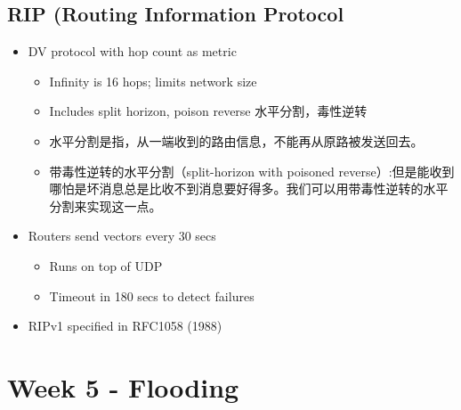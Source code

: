 \documentclass[12pt]{ctexart}   %
\begin{document}
	\subsection{RIP (Routing Information Protocol}
	\begin{itemize}
		\item DV protocol with hop count as metric
		\begin{itemize}
			\item Infinity is 16 hops; limits network size
			\item Includes split horizon, poison reverse 水平分割，毒性逆转
			\item 水平分割是指，从一端收到的路由信息，不能再从原路被发送回去。
			\item 带毒性逆转的水平分割（split-horizon with poisoned reverse）:但是能收到哪怕是坏消息总是比收不到消息要好得多。我们可以用带毒性逆转的水平分割来实现这一点。
		\end{itemize}
		
		\item Routers send vectors every 30 secs
		\begin{itemize}
			\item Runs on top of UDP
			\item Timeout in 180 secs to detect failures
		\end{itemize}
		
		\item RIPv1 specified in RFC1058 (1988)
	\end{itemize}
	
\section{Week 5 - Flooding}
\end{document}
